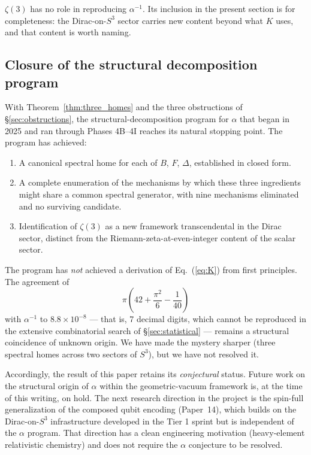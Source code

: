 \documentclass[aps,prl,twocolumn,superscriptaddress]{revtex4-2}
\begin{document}
$\zeta(3)$ has no role in reproducing $\alpha^{-1}$. Its inclusion in
the present section is for completeness: the Dirac-on-$S^{3}$ sector
carries new content beyond what $K$ uses, and that content is worth
naming.

\subsection{Closure of the structural decomposition program}\label{sec:closure}

With Theorem~\ref{thm:three_homes} and the three obstructions of
\S\ref{sec:obstructions}, the structural-decomposition program for
$\alpha$ that began in 2025 and ran through Phases 4B--4I reaches its
natural stopping point. The program has achieved:

\begin{enumerate}
  \item A canonical spectral home for each of $B$, $F$, $\Delta$,
    established in closed form.
  \item A complete enumeration of the mechanisms by which these three
    ingredients might share a common spectral generator, with nine
    mechanisms eliminated and no surviving candidate.
  \item Identification of $\zeta(3)$ as a new framework transcendental
    in the Dirac sector, distinct from the Riemann-zeta-at-even-integer
    content of the scalar sector.
\end{enumerate}

The program has \emph{not} achieved a derivation of Eq.~(\ref{eq:K})
from first principles. The agreement of
\begin{equation}
  \pi\!\left(42 + \frac{\pi^{2}}{6} - \frac{1}{40}\right)
\end{equation}
with $\alpha^{-1}$ to $8.8 \times 10^{-8}$ — that is, 7 decimal digits,
which cannot be reproduced in the extensive combinatorial search of
\S\ref{sec:statistical} — remains a structural coincidence of unknown
origin. We have made the mystery sharper (three spectral homes across
two sectors of $S^{3}$), but we have not resolved it.

Accordingly, the result of this paper retains its \emph{conjectural}
status. Future work on the structural origin of $\alpha$ within the
geometric-vacuum framework is, at the time of this writing, on hold.
The next research direction in the project is the spin-full
generalization of the composed qubit encoding (Paper~14), which builds
on the Dirac-on-$S^{3}$ infrastructure developed in the Tier 1 sprint
but is independent of the $\alpha$ program. That direction has a clean
engineering motivation (heavy-element relativistic chemistry) and does
not require the $\alpha$ conjecture to be resolved.
\end{document}
